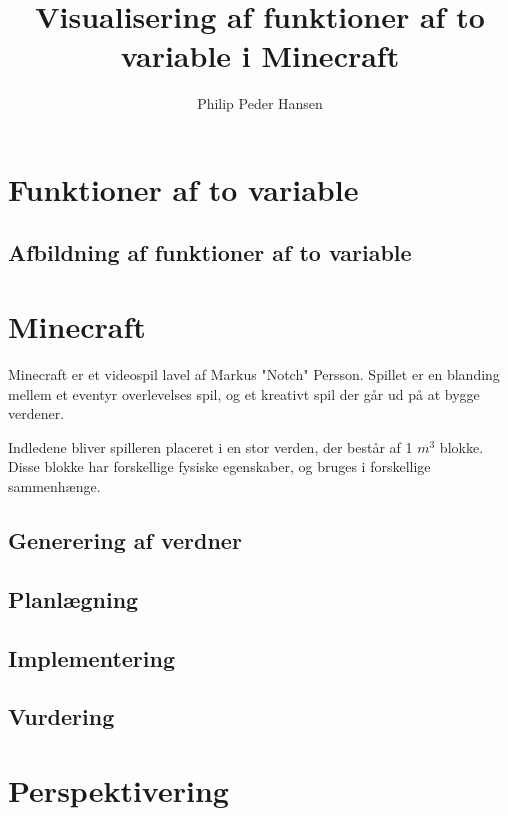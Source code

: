 \documentclass[a4paper,12pt]{report}
\author{Philip Peder Hansen}
\title{Visualisering af funktioner af to variable i Minecraft}
\begin{document}
	\maketitle
	\tableofcontents
	\section{Funktioner af to variable}
	\subsection{Afbildning af funktioner af to variable}
	\section{Minecraft}
		Minecraft er et videospil lavel af Markus "Notch" Persson.
		Spillet er en blanding mellem et eventyr overlevelses spil, og et kreativt spil der går ud på at bygge verdener.

		Indledene bliver spilleren placeret i en stor verden, der består af 1 $m^3$ blokke. Disse blokke har forskellige fysiske egenskaber,
		og bruges i forskellige sammenhænge.
	\subsection{Generering af verdner}
	\subsection{Planlægning}
	\subsection{Implementering}
	\subsection{Vurdering}
	\section{Perspektivering}
\end{document}
